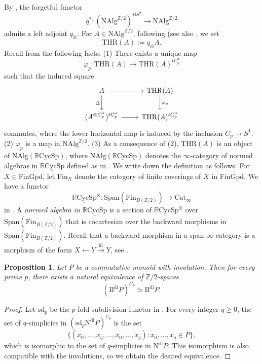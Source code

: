 \documentclass[10pt]{amsart}
\newtheorem{prop}[thm]{Proposition}
\theoremstyle{definition}
\theoremstyle{remark}
\numberwithin{equation}{section}
\newcommand{\Z}{\mathbb{Z}}
\newcommand{\id}{\mathrm{id}}
\newcommand{\ul}{\underline}
\newcommand{\NAlg}{\mathrm{NAlg}}
\newcommand{\Span}{\mathrm{Span}}
\newcommand{\Fin}{\mathrm{Fin}}
\newcommand{\FinGpd}{\mathrm{FinGpd}}
\newcommand{\Bdi}{\mathrm{B}^{\mathrm{di}}}
\newcommand{\Ndi}{\mathrm{N}^\mathrm{di}}
\newcommand{\RCycSp}{\mathbb{R}\mathrm{CycSp}}
\newcommand{\THR}{\mathrm{THR}}
\newcommand{\sd}{\mathrm{sd}}
\newcommand{\Ztwo}{{\mathbb{Z}/2}}
\newcommand{\Cat}{\mathrm{Cat}}
\begin{document}
By \cite[Proposition 3.7]{synTCR},
the forgetful functor
\[
q^*
\colon
(\NAlg^{\Z/2})^{BS^\sigma}
\to
\NAlg^{\Ztwo}
\]
admits a left adjoint $q_\otimes$.
For $A\in \NAlg^{\Ztwo}$,
following \cite[\S 5]{QS2} (see also \cite[Definition 3.11, Proposition 3.12]{synTCR},
we set
\[
\THR(A):=
q_\otimes A.
\]
Recall from \cite[\S 5]{QS2} the following facts:
(1) There exists a unique map
\[
\varphi_p
\colon
\THR(A)
\to
\THR(A)^{tC_p^\sigma}
\]
such that the induced square
\begin{equation}
\label{TCR.0.1}
\begin{tikzcd}
A\ar[d,"\Delta"']\ar[r]&
\THR(A)\ar[d,"\varphi_p"]
\\
(A^{\otimes C_p^\sigma})^{tC_p^\sigma}\ar[r]&
\THR(A)^{tC_p^\sigma}
\end{tikzcd}
\end{equation}
commutes,
where the lower horizontal map is induced by the inclusion $C_p\to S^1$.
(2) $\varphi_p$ is a map in $\NAlg^{\Z/2}$.
(3) As a consequence of (2),
$\THR(A)$ is an object of $\NAlg(\RCycSp)$,
where $\NAlg(\RCycSp)$ denotes the $\infty$-category of normed algebras in $\ul{\RCycSp}$ defined as in \cite[Definition 9.14]{BH21}.
We write down the definition as follows.
For $X\in \FinGpd$,
let $\Fin_X$ denote the category of finite coverings of $X$ in $\FinGpd$.
We have a functor
\[
\ul{\RCycSp}^\otimes
\colon
\Span(\Fin_{B(\Z/2)})
\to
\Cat_\infty
\]
in \cite[Point 3 after Remark 4.3]{QS2}.
A \emph{normed algebra in $\ul{\RCycSp}$} is a section of $\ul{\RCycSp}^\otimes$ over $\Span(\Fin_{B(\Z/2)})$ that is cocartesian over the backward morphisms in $\Span(\Fin_{B(\Z/2)})$. Recall that a backward morphism in a span $\infty$-category is a morphism of the form $X\leftarrow Y \xrightarrow{\id} Y$, see \cite[Appendix C]{BH21}.













\begin{prop}
\label{TCR.1}
Let $P$ be a commutative monoid with involution.
Then for every prime $p$,
there exists a natural equivalence of $\Z/2$-spaces
\begin{equation}
\label{TCR.1.1}
(\Bdi P)^{C_p}
\simeq
\Bdi P.
\end{equation}
\end{prop}
\begin{proof}
Let $\sd_p$ be the $p$-fold subdivision functor in \cite{BHM93}.
For every integer $q\geq 0$,
the set of $q$-simplicies in $(\sd_p \Ndi P)^{C_p}$ is the set
\[
\{
(x_0,\ldots,x_q,\ldots,x_0,\ldots,x_q):
x_0,\ldots,x_q\in P
\},
\]
which is isomorphic to the set of $q$-simplicies in $\Ndi P$.
This isomorphism is also compatible with the involutions,
so we obtain the desired equivalence.
\end{proof}
\end{document}
